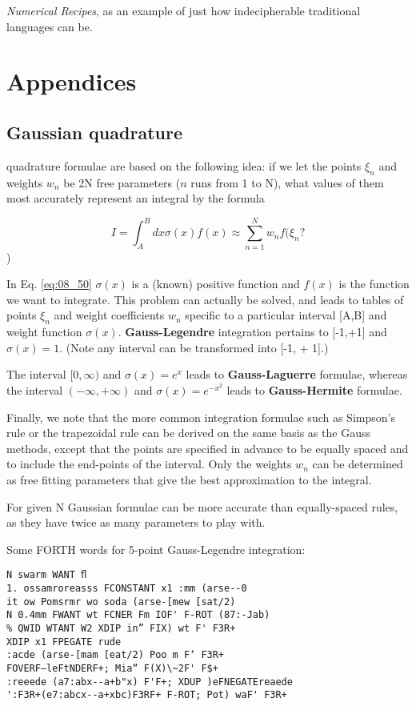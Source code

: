 \textit{Numerical Recipes}, as an example of just how indecipherable traditional languages can be.

\section{Appendices}

\subsection{Gaussian quadrature}

 quadrature formulae are based on the following idea: if we let the points $\xi_{n}$ and weights $w_{n}$ be 2N free parameters ($n$ runs from 1 to N), what values of them most accurately represent an integral by the formula

\begin{equation}\label{eq:08_50}
I = \int_{A}^{B} dx \sigma(x)f(x) \approx \sum_{n=1}^{N} w_{n}f(\xi_{n} ?
\end{equation})

In Eq. \ref{eq:08_50} $\sigma(x)$ is a (known) positive function and $f(x)$ is the function we want to integrate. This problem can actually be solved, and leads to tables of points $\xi_n$ and weight coefficients $w_{n}$ specific to a particular interval [A,B] and weight function $\sigma(x)$. \textbf{Gauss-Legendre} integration pertains to [-1,+1] and $\sigma(x) = 1$. (Note any interval can be transformed into [-1, + 1].)

The interval $[0, \infty)$ and $\sigma(x) = e^{x}$ leads to \textbf{Gauss-Laguerre} formulae, whereas the interval $(-\infty, +\infty)$ and $\sigma(x) = e^{-x^{2}}$ leads to \textbf{Gauss-Hermite} formulae.

Finally, we note that the more common integration formulae such as Simpson’s rule or the trapezoidal rule can be derived on the same basis as the Gauss methods, except that the points are specified in advance to be equally spaced and to include the end-points of the interval. Only the weights $w_{n}$ can be determined as free fitting parameters that give the best approximation to the integral.

For given N Gaussian formulae can be more accurate than equally-spaced rules, as they have twice as many parameters to play with.


Some FORTH words for 5-point Gauss-Legendre integration:

\begin{lstlisting}
N swarm WANT ﬂ
1. ossamroreasss FCONSTANT x1 :mm (arse--0
it ow Pomsrmr wo soda (arse-[mew [sat/2)
N 0.4mm FWANT wt FCNER Fm IOF' F-ROT (87:-Jab)
% QWID WTANT W2 XDIP in” FIX) wt F' F3R+
XDIP x1 FPEGATE rude
:acde (arse-[mam [eat/2) Poo m F‘ F3R+
FOVERF—leFtNDERF+; Mia“ F(X)\~2F' F$+
:reeede (a7:abx--a+b"x) F'F+; XDUP )eFNEGATEreaede
':F3R+(e7:abcx--a+xbc)F3RF+ F-ROT; Pot) waF' F3R+
\end{lstlisting}

